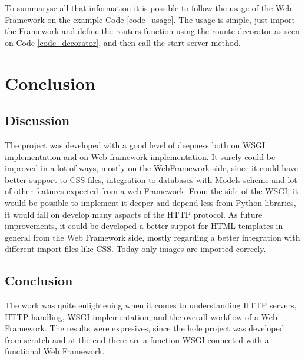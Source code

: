 \documentclass[journal,12pt,onecolumn,draftclsnofoot,]{IEEEtran}
\begin{document}
To summaryse all that information it is possible to follow the usage of the Web Framework on the example Code \ref{code_usage}. The usage is simple, just import the Framework and define the routers function using the rounte decorator as seen on Code \ref{code_decorator}, and then call the start server method.








\section{Conclusion}

\subsection{Discussion}
 The project was developed with a good level of deepness both on WSGI implementation and on Web framework implementation. It surely could be improved in a lot of ways, mostly on the WebFramework side, since it could have better support to CSS files, integration to databases with Models scheme and lot of other features expected from  a web Framework. From the side of the WSGI, it would be possible to implement it deeper and depend less from Python libraries, it would fall on develop many aspacts of the HTTP protocol.
 As future improvements, it could be developed a better suppot for HTML templates in general from the Web Framework side, mostly regarding a better integration with different import files like CSS. Today only images are imported correcly.
\subsection{Conclusion}
The work was quite enlightening when it comes to understanding HTTP servers, HTTP handling, WSGI implementation, and the overall workflow of a Web Framework. The results were expresives, since the hole project was developed from scratch and at the end there are a function WSGI connected with a functional Web Framework.



\printbibliography


\vfill
\end{document}
